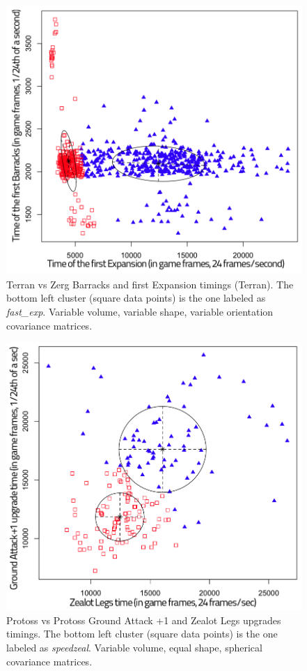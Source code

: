 \begin{figure}[h]
\centerline{\includegraphics[width=0.7\columnwidth]{images/TvZraxFE.png}}
\caption{Terran vs Zerg Barracks and first Expansion timings (Terran). The bottom left cluster (square data points) is the one labeled as \textit{fast\_exp}. Variable volume, variable shape, variable orientation covariance matrices.}
\label{TvZraxFE}
\end{figure}

\begin{figure}[h]
\centerline{\includegraphics[width=0.7\columnwidth]{images/PvPspeedzeal.png}}
\caption{Protoss vs Protoss Ground Attack +1 and Zealot Legs upgrades timings. The bottom left cluster (square data points) is the one labeled as \textit{speedzeal}. Variable volume, equal shape, spherical covariance matrices.}
\label{PvPspeedzeal}
\end{figure}

